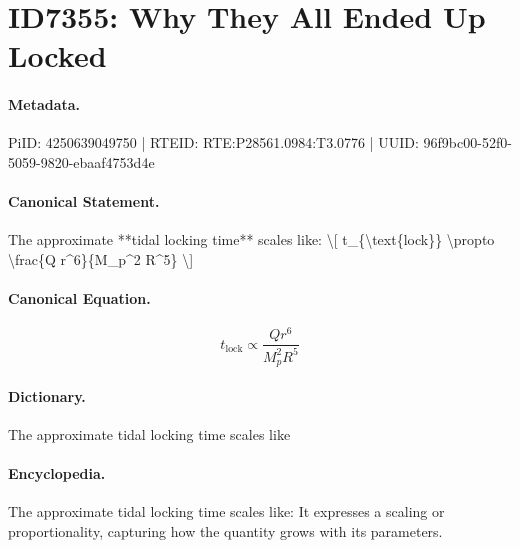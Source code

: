 \section*{ID7355: Why They All Ended Up Locked}
\paragraph{Metadata.}
PiID: 4250639049750 | RTEID: RTE:P28561.0984:T3.0776 | UUID: 96f9bc00-52f0-5059-9820-ebaaf4753d4e

\paragraph{Canonical Statement.}
The approximate **tidal locking time** scales like: \textbackslash{}[ t\_\{\textbackslash{}text\{lock\}\} \textbackslash{}propto \textbackslash{}frac\{Q r\textasciicircum{}6\}\{M\_p\textasciicircum{}2 R\textasciicircum{}5\} \textbackslash{}]

\paragraph{Canonical Equation.}
\[
t_{\text{lock}} \propto \frac{Q r^6}{M_p^2 R^5}
\]

\paragraph{Dictionary.}
The approximate tidal locking time scales like

\paragraph{Encyclopedia.}
The approximate tidal locking time scales like: It expresses a scaling or proportionality, capturing how the quantity grows with its parameters.
